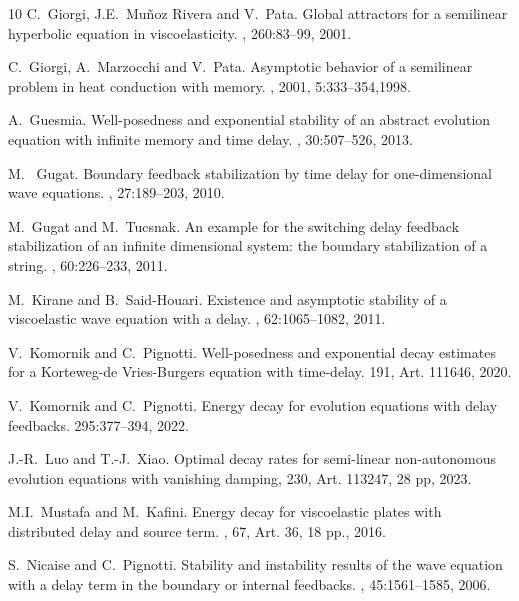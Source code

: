 \documentclass[11pt]{article}
\begin{document}
\begin{thebibliography}{10}
{\sc C.~Giorgi, J.E.~Mu\~{n}oz Rivera and V.~Pata}.
\newblock Global attractors for a semilinear hyperbolic equation in viscoelasticity.
, 260:83--99,
2001.


{\sc C.~Giorgi, A.~Marzocchi and V.~Pata}.
\newblock Asymptotic behavior of a semilinear problem
in heat conduction with memory.
,
2001, 5:333--354,1998.

{\sc A.~Guesmia.}
\newblock Well-posedness and exponential stability of an abstract evolution equation with
infinite memory and time delay.
, 30:507--526, 2013.

{\sc M.~ Gugat.}
\newblock Boundary feedback stabilization by time delay for one-dimensional wave equations.
, 27:189--203, 2010.

{\sc M.~Gugat and M.~Tucsnak.}
\newblock An example for the switching delay feedback stabilization of an infinite dimensional system: the boundary stabilization of a string.
, 60:226--233, 2011.

 {\sc M.~Kirane and B.~Said-Houari}.
 \newblock Existence and asymptotic stability of a viscoelastic wave equation with a delay.
 , 62:1065--1082, 2011.

{\sc V.~Komornik and C.~Pignotti.}
\newblock Well-posedness and exponential decay estimates for a
Korteweg-de Vries-Burgers equation with time-delay.
 191, Art. 111646,
2020.


{\sc V.~Komornik and C.~Pignotti}.
\newblock Energy decay for evolution equations with delay feedbacks.
 295:377--394, 2022.

{\sc J.-R.~Luo and T.-J.~Xiao}.
\newblock Optimal decay rates for semi-linear non-autonomous evolution equations with vanishing damping,
 230, Art. 113247, 28 pp, 2023.

 {\sc M.I.~Mustafa and M.~Kafini}.
 \newblock Energy decay for viscoelastic plates with distributed delay and source term.
 , 67, Art. 36, 18 pp., 2016.

{\sc S.~Nicaise and C.~Pignotti.}
\newblock Stability and instability results of the wave equation with a delay term in the boundary or internal feedbacks.
,  45:1561--1585, 2006.



\end{thebibliography}
\end{document}
